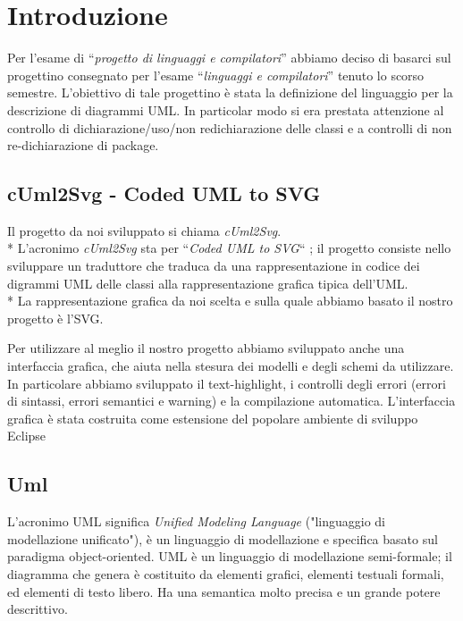 \chapter{Introduzione}

Per l'esame di ``\emph{progetto di linguaggi e compilatori}'' abbiamo deciso di
basarci sul progettino consegnato per l'esame ``\emph{linguaggi e compilatori}''
tenuto lo scorso semestre.
L'obiettivo di tale progettino è stata la definizione del linguaggio per la 
descrizione di diagrammi UML. In particolar modo si era prestata attenzione al
controllo di dichiarazione/uso/non redichiarazione
delle classi e a controlli di non re-dichiarazione di package.


\section{cUml2Svg - Coded UML to SVG} 
Il progetto da noi sviluppato si chiama \emph{cUml2Svg}. \\*  
L'acronimo \emph{cUml2Svg} sta per ``\emph{Coded UML to SVG}`` ; 
il progetto consiste nello sviluppare un traduttore che traduca da una
rappresentazione in codice dei digrammi UML delle classi alla rappresentazione
grafica tipica dell'UML.\\*
La rappresentazione grafica da noi scelta e sulla quale abbiamo basato il nostro
progetto è l'SVG.

Per utilizzare al meglio il nostro progetto abbiamo sviluppato anche una 
interfaccia grafica, che aiuta nella stesura dei modelli e degli schemi da
utilizzare. In particolare abbiamo sviluppato il text-highlight, i
controlli degli errori (errori di sintassi, errori semantici e warning) e la
compilazione automatica.
L'interfaccia grafica è stata costruita come estensione del popolare ambiente 
 di sviluppo Eclipse~\cite{eclipse_website:1}


\section{Uml}  

L'acronimo UML significa \emph{Unified Modeling Language} ("linguaggio di modellazione
unificato"), è un linguaggio di modellazione e specifica basato sul paradigma object-oriented. 
UML è un linguaggio di modellazione semi-formale; il diagramma che genera è costituito da elementi
grafici, elementi testuali formali, ed elementi di testo libero. Ha una semantica molto precisa e un
grande potere descrittivo.


